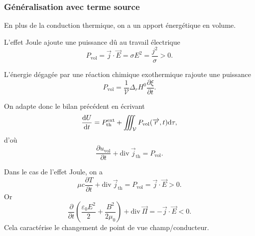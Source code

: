         \subsubsection{Généralisation avec terme source}

            En plus de la conduction thermique, on a un apport énergétique en volume.

            \begin{example}
                L'effet Joule ajoute une puissance dû au travail électrique
                \begin{equation}
                    P_{\text{vol}}=\vec{j}\cdot\vec{E}=\sigma E^{2}=\frac{j^{2}}{\sigma}>0.
                \end{equation}
            \end{example}
            \begin{example}
                L'énergie dégagée par une réaction chimique exothermique rajoute une puissance
                \begin{equation}
                    P_{\text{vol}}=\frac{1}{\mathcal{V}}\Delta_r H^{0}\frac{\partial\xi}{\partial t}.
                \end{equation}
            \end{example}

            On adapte donc le bilan précédent en écrivant
            \begin{equation}
                \frac{\mathrm{d} U}{\mathrm{d} t}=P_{\text{th}}^{\text{ext}}+\iiint_{\mathcal{V}}P_{\text{vol}}(\protect\overrightarrow{{r}},t)\mathrm{d}\tau,
            \end{equation}
            d'où
            \begin{equation}
                \boxed{
                    \frac{\partial u_{\text{vol}}}{\partial t}+\mathrm{div}~\vec{j}_{\text{th}}=P_{\text{vol}}.
                }
            \end{equation}

            \begin{example}
                Dans le cas de l'effet Joule, on a 
                \begin{equation}
                    \mu c\frac{\partial T}{\partial t}+\mathrm{div}~\vec{j}_{\text{th}}=P_{\text{vol}}=\vec{j}\cdot\vec{E}>0.
                \end{equation}
                Or 
                \begin{equation}
                    \frac{\partial}{\partial t}\left(\frac{\varepsilon_{0}E^{2}}{2}+\frac{B^{2}}{2\mu_0}\right)+\mathrm{div}~\vec{\Pi}=-\vec{j}\cdot\vec{E}<0.
                \end{equation}
                Cela caractérise le changement de point de vue champ/conducteur.
            \end{example}


